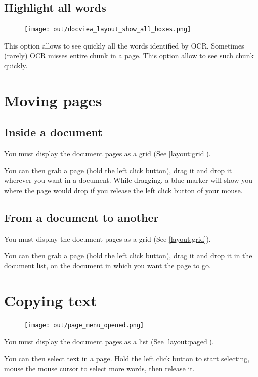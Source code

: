 \documentclass[10pt,a4paper]{article}
\begin{document}
\subsection{Highlight all words}

\begin{figure}[H]
	\texttt{[image: out/docview\_layout\_show\_all\_boxes.png]}
\end{figure}

This option allows to see quickly all the words identified by OCR. Sometimes
(rarely) OCR misses entire chunk in a page. This option allow to see such
chunk quickly.

\section{Moving pages}

\subsection{Inside a document}

You must display the document pages as a grid (See \ref{layout:grid}).

You can then grab a page (hold the left click button), drag it and drop
it wherever you want in a document. While dragging, a blue marker will show
you where the page would drop if you release the left click button of your
mouse.

\subsection{From a document to another}

You must display the document pages as a grid (See \ref{layout:grid}).

You can then grab a page (hold the left click button), drag it and drop
it in the document list, on the document in which you want the page to go.

\section{Copying text}

\begin{figure}[H]
	\texttt{[image: out/page\_menu\_opened.png]}
\end{figure}

You must display the document pages as a list (See \ref{layout:paged}).

You can then select text in a page. Hold the left click button to start
selecting, mouse the mouse cursor to select more words, then release it.
\end{document}
